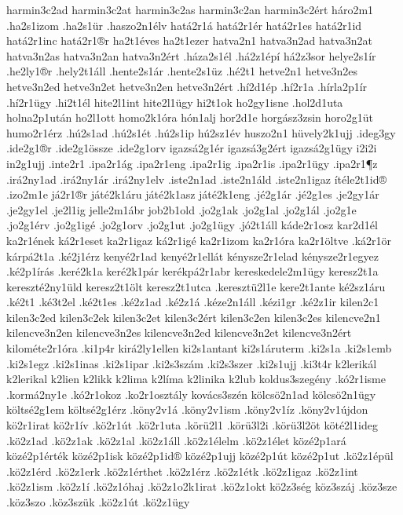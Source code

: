 {harmin3c2ad
harmin3c2at
harmin3c2as
harmin3c2an
harmin3c2ért
háro2m1
.ha2s1izom
.ha2s1ür
.haszo2n1élv
hatá2r1á
hatá2r1ér
hatá2r1es
hatá2r1id
hatá2r1inc
hatá2r1®r
ha2t1éves
ha2t1ezer
hatva2n1
hatva3n2ad
hatva3n2at
hatva3n2as
hatva3n2an
hatva3n2ért
.háza2s1él
.há2z1épí
há2z3sor
helye2s1ír
.he2ly1®r
.hely2t1áll
.hente2s1ár
.hente2s1üz
.hé2t1
hetve2n1
hetve3n2es
hetve3n2ed
hetve3n2et
hetve3n2en
hetve3n2ért
.hí2d1ép
.hí2r1a
.hírla2p1ír
.hí2r1ügy
.hi2t1él %
hite2l1int
hite2l1ügy
hi2t1ok
ho2gy1isne
.hol2d1uta
holna2p1után
ho2l1ott
homo2k1óra
hón1alj
hor2d1e
horgász3zsin
horo2g1üt
humo2r1érz
.hú2s1ad
.hú2s1ét
.hú2s1ip
hú2sz1év
huszo2n1
hüvely2k1ujj
.ideg3gy
.ide2g1®r
.ide2g1össze
.ide2g1orv
igazsá2g1ér
igazsá3g2ért
igazsá2g1ügy
i2i2i %
in2g1ujj
.inte2r1
.ipa2r1ág
.ipa2r1eng
.ipa2r1ig
.ipa2r1is
.ipa2r1ügy
.ipa2r1¶z
.irá2ny1ad
.irá2ny1ár
.irá2ny1elv
.iste2n1ad
.iste2n1áld
.iste2n1igaz
ítéle2t1id®
.izo2m1e
já2r1®r
játé2k1áru
játé2k1asz
játé2k1eng
.jé2g1ár
.jé2g1es
.je2gy1ár
.je2gy1el
.je2l1ig
jelle2m1ábr
job2b1old
.jo2g1ak
.jo2g1al
.jo2g1ál
.jo2g1e
.jo2g1érv
.jo2g1igé
.jo2g1orv
.jo2g1ut
.jo2g1ügy
.jó2t1áll
káde2r1osz
kar2d1él
ka2r1ének
ká2r1eset
ka2r1igaz
ká2r1igé
ka2r1izom
ka2r1óra
ka2r1öltve
.ká2r1ör
kárpá2t1a %
.ké2j1érz
kenyé2r1ad
kenyé2r1ellát
kénysze2r1elad
kénysze2r1egyez
.ké2p1írás
.keré2k1a
keré2k1pár
kerékpá2r1abr
kereskedele2m1ügy
keresz2t1a
kereszté2ny1üld
keresz2t1ölt
keresz2t1utca
.keresztü2l1e
kere2t1ante
ké2sz1áru
.ké2t1
.ké3t2el
.ké2t1es
.ké2z1ad
.ké2z1á
.kéze2n1áll
.kézi1gr
.ké2z1ir
kilen2c1
kilen3c2ed
kilen3c2ek
kilen3c2et
kilen3c2ért
kilen3c2en
kilen3c2es
kilencve2n1
kilencve3n2en
kilencve3n2es
kilencve3n2ed
kilencve3n2et
kilencve3n2ért
kilométe2r1óra
.ki1p4r
kirá2ly1ellen
ki2s1antant
ki2s1áruterm
.ki2s1a
.ki2s1emb
.ki2s1egz
.ki2s1inas
.ki2s1ipar
.ki2s3szám
.ki2s3szer
.ki2s1ujj
.ki3t4r
k2lerikál
k2lerikal
k2lien
k2likk
k2lima
k2líma
k2linika
k2lub
koldus3szegény
.kó2r1isme
.kormá2ny1e
.kó2r1okoz
.ko2r1osztály
kovács3szén
kölcsö2n1ad
kölcsö2n1ügy
költsé2g1em
költsé2g1érz %
.köny2v1á
.köny2v1ism
.köny2v1íz
.köny2v1újdon
kö2r1irat
kö2r1ív
.kö2r1út
.kö2r1uta
.körü2l1
.körü3l2i
.körü3l2öt
köté2l1ideg
.kö2z1ad
.kö2z1ak
.kö2z1al
.kö2z1áll
.kö2z1élelm
.kö2z1élet
közé2p1ará
közé2p1érték
közé2p1isk
közé2p1id®
közé2p1ujj
közé2p1út
közé2p1ut
.kö2z1épül
.kö2z1érd
.kö2z1erk
.kö2z1érthet
.kö2z1érz
.kö2z1étk
.kö2z1igaz
.kö2z1int
.kö2z1ism
.kö2z1í
.kö2z1óhaj
.kö2z1o2k1irat
.kö2z1okt
kö2z3ség
köz3száj
.köz3sze
.köz3szo
.köz3szük
.kö2z1út
.kö2z1ügy
}
